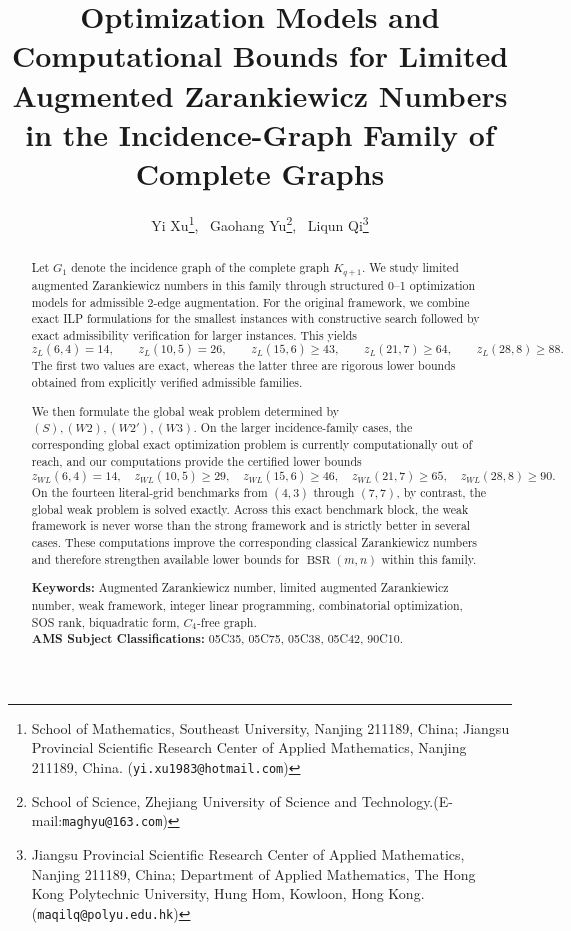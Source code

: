 \documentclass[10pt]{article}
\newcommand{\blue}[1]{#1}
\newcommand{\0}{\mathbf{0}}
\newcommand{\1}{\mathbf{1}}
\begin{document}
	
\title{\blue{Optimization Models and Computational Bounds for Limited Augmented Zarankiewicz Numbers in the Incidence-Graph Family of Complete Graphs}}
	\author{Yi Xu\footnote{School of Mathematics, Southeast University, Nanjing 211189, China;  Jiangsu Provincial Scientific Research Center of Applied Mathematics, Nanjing 211189, China. ({\tt yi.xu1983@hotmail.com})}, \  Gaohang Yu\thanks{School of Science, Zhejiang University of Science and Technology.(E-mail:{\tt maghyu@163.com})}, \ Liqun Qi\thanks{Jiangsu Provincial Scientific Research Center of Applied Mathematics, Nanjing 211189, China; Department of Applied Mathematics, The Hong Kong Polytechnic University, Hung Hom, Kowloon, Hong Kong. ({\tt maqilq@polyu.edu.hk})}
	}
	
	\date{}
	\maketitle

\begin{abstract}
{Let $G_1$ denote the incidence graph of the complete graph $K_{q+1}$. We study limited augmented Zarankiewicz numbers in this family through structured 0--1 optimization models for admissible 2-edge augmentation. For the original framework, we combine exact ILP formulations for the smallest instances with constructive search followed by exact admissibility verification for larger instances. This yields}
\[
{z_L(6,4)=14,\qquad z_L(10,5)=26,\qquad z_L(15,6)\ge 43,\qquad z_L(21,7)\ge 64,\qquad z_L(28,8)\ge 88.}
\]
{The first two values are exact, whereas the latter three are rigorous lower bounds obtained from explicitly verified admissible families.}

{We then formulate the global weak problem determined by \((S),(W2),(W2'),(W3)\). On the larger incidence-family cases, the corresponding global exact optimization problem is currently computationally out of reach, and our computations provide the certified lower bounds}
\[
{z_{WL}(6,4)=14,\quad z_{WL}(10,5)\ge 29,\quad z_{WL}(15,6)\ge 46,\quad z_{WL}(21,7)\ge 65,\quad z_{WL}(28,8)\ge 90.}
\]
{On the fourteen literal-grid benchmarks from $(4,3)$ through $(7,7)$, by contrast, the global weak problem is solved exactly. Across this exact benchmark block, the weak framework is never worse than the strong framework and is strictly better in several cases. These computations improve the corresponding classical Zarankiewicz numbers and therefore strengthen available lower bounds for $\operatorname{BSR}(m,n)$ within this family.}

\medskip
\noindent\textbf{Keywords:} Augmented Zarankiewicz number, limited augmented Zarankiewicz number, weak framework, integer linear programming, combinatorial optimization, SOS rank, biquadratic form, \(C_4\)-free graph.\\

\noindent\textbf{AMS Subject Classifications:} 05C35, 05C75, 05C38, 05C42, 90C10.\\
\end{abstract}
\end{document}

